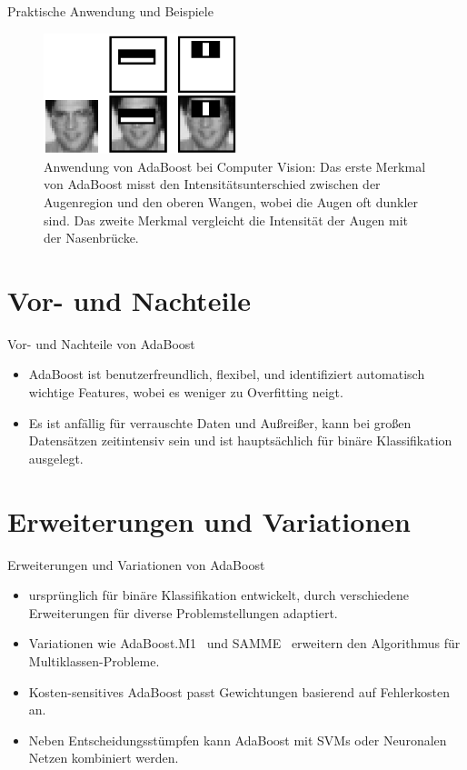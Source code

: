 \documentclass[hyperref={bookmarks=false},11pt,dvipsnames]{beamer}
\begin{document}
\begin{frame}{Praktische Anwendung und Beispiele}
	\begin{figure}
		\centering
		\includegraphics[width=0.5\textwidth]{../Ausarbeitung/figures/CV_Example.png}
		\caption{Anwendung von AdaBoost bei Computer Vision:
			Das erste Merkmal von AdaBoost misst den Intensitätsunterschied
			zwischen der Augenregion und den oberen Wangen,
			wobei die Augen oft dunkler sind. Das zweite Merkmal vergleicht die
			Intensität der Augen mit der Nasenbrücke.\cite{viola2001rapid}}
	\end{figure}
\end{frame}
\section{Vor- und Nachteile}
\begin{frame}{Vor- und Nachteile von AdaBoost}
	\begin{itemize}
		\item <1-> AdaBoost ist benutzerfreundlich, flexibel, und identifiziert
		      automatisch wichtige Features, wobei es weniger zu Overfitting neigt.
		\item <2-> Es ist anfällig für verrauschte Daten und Außreißer, kann bei großen Datensätzen
		      zeitintensiv sein und ist hauptsächlich für binäre Klassifikation ausgelegt.
	\end{itemize}
\end{frame}

\section{Erweiterungen und Variationen}
\begin{frame}{Erweiterungen und Variationen von AdaBoost}
	\begin{itemize}
		\item <1-> ursprünglich für binäre Klassifikation entwickelt,
		      durch verschiedene Erweiterungen für diverse Problemstellungen adaptiert.
		\item <2-> Variationen wie \glqq AdaBoost.M1\grqq~ und \glqq SAMME\grqq~
		      erweitern den Algorithmus für Multiklassen-Probleme.
		\item <3-> Kosten-sensitives AdaBoost passt Gewichtungen basierend auf Fehlerkosten an.
		\item <4-> Neben Entscheidungsstümpfen kann AdaBoost mit SVMs oder
		      Neuronalen Netzen kombiniert werden.

	\end{itemize}
\end{frame}
\end{document}
